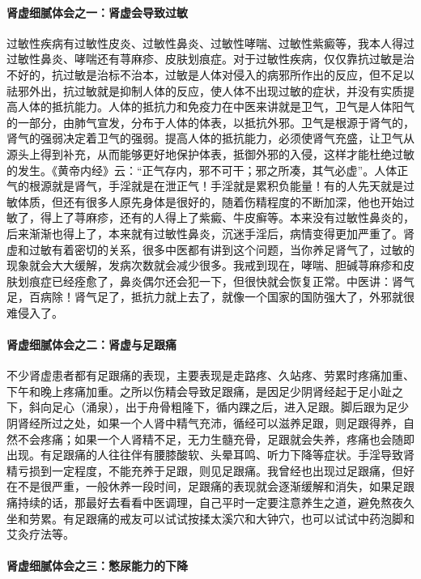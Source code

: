 \paragraph{肾虚细腻体会之一：肾虚会导致过敏}

过敏性疾病有过敏性皮炎、过敏性鼻炎、过敏性哮喘、过敏性紫癜等，我本人得过过敏性鼻炎、哮喘还有荨麻疹、皮肤划痕症。对于过敏性疾病，仅仅靠抗过敏是治不好的，抗过敏是治标不治本，过敏是人体对侵入的病邪所作出的反应，但不足以祛邪外出，抗过敏就是抑制人体的反应，使人体不出现过敏的症状，并没有实质提高人体的抵抗能力。人体的抵抗力和免疫力在中医来讲就是卫气，卫气是人体阳气的一部分，由肺气宣发，分布于人体的体表，以抵抗外邪。卫气是根源于肾气的，肾气的强弱决定着卫气的强弱。提高人体的抵抗能力，必须使肾气充盛，让卫气从源头上得到补充，从而能够更好地保护体表，抵御外邪的入侵，这样才能杜绝过敏的发生。《黄帝内经》云：“正气存内，邪不可干；邪之所凑，其气必虚”。人体正气的根源就是肾气，手淫就是在泄正气！手淫就是累积负能量！有的人先天就是过敏体质，但还有很多人原先身体是很好的，随着伤精程度的不断加深，他也开始过敏了，得上了荨麻疹，还有的人得上了紫癜、牛皮癣等。本来没有过敏性鼻炎的，后来渐渐也得上了，本来就有过敏性鼻炎，沉迷手淫后，病情变得更加严重了。肾虚和过敏有着密切的关系，很多中医都有讲到这个问题，当你养足肾气了，过敏的现象就会大大缓解，发病次数就会减少很多。我戒到现在，哮喘、胆碱荨麻疹和皮肤划痕症已经痊愈了，鼻炎偶尔还会犯一下，但很快就会恢复正常。中医讲：肾气足，百病除！肾气足了，抵抗力就上去了，就像一个国家的国防强大了，外邪就很难侵入了。

\paragraph{肾虚细腻体会之二：肾虚与足跟痛}

不少肾虚患者都有足跟痛的表现，主要表现是走路疼、久站疼、劳累时疼痛加重、下午和晚上疼痛加重。之所以伤精会导致足跟痛，是因足少阴肾经起于足小趾之下，斜向足心（涌泉），出于舟骨粗隆下，循内踝之后，进入足跟。脚后跟为足少阴肾经所过之处，如果一个人肾中精气充沛，循经可以滋养足跟，则足跟得养，自然不会疼痛；如果一个人肾精不足，无力生髓充骨，足跟就会失养，疼痛也会随即出现。有足跟痛的人往往伴有腰膝酸软、头晕耳鸣、听力下降等症状。手淫导致肾精亏损到一定程度，不能充养于足跟，则见足跟痛。我曾经也出现过足跟痛，但好在不是很严重，一般休养一段时间，足跟痛的表现就会逐渐缓解和消失，如果足跟痛持续的话，那最好去看看中医调理，自己平时一定要注意养生之道，避免熬夜久坐和劳累。有足跟痛的戒友可以试试按揉太溪穴和大钟穴，也可以试试中药泡脚和艾灸疗法等。

\paragraph{肾虚细腻体会之三：憋尿能力的下降}

